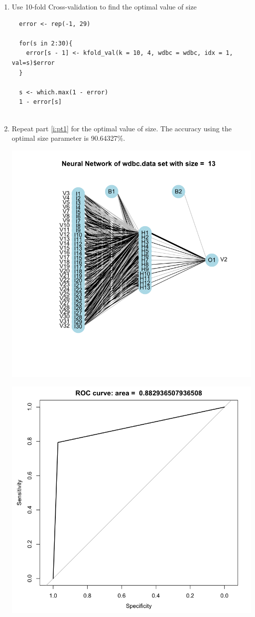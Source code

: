 \documentclass[11pt]{article}
\begin{document}
\begin{enumerate}
\begin{enumerate}
\item Use 10-fold Cross-validation to find the optimal value of size

  \begin{Verbatim}
  error <- rep(-1, 29)
  
  for(s in 2:30){
    error[s - 1] <- kfold_val(k = 10, 4, wdbc = wdbc, idx = 1, val=s)$error
  }
  
  s <- which.max(1 - error)
  1 - error[s]
  
  \end{Verbatim}
\item Repeat part \ref{i:pt1} for the optimal value of size.
The accuracy using the optimal size parameter is 90.64327\%.

\begin{center}
\includegraphics[scale=0.35]{nnet_13}
\end{center}
\begin{center}
\includegraphics[scale=0.35]{roc_curve_13}

\end{center}
\end{enumerate}
\end{enumerate}
\end{document}
